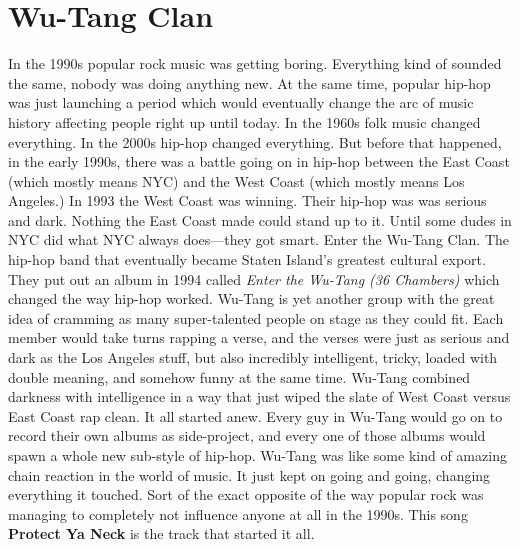 \documentclass[letterpaper,single]{article}
\begin{document}
\section{Wu-Tang Clan}
In the 1990s popular rock music was getting boring. Everything kind
of sounded the same, nobody was doing anything new. At the same time,
popular hip-hop was just launching a period which would eventually
change the arc of music history affecting people right up until today.
In the 1960s folk music changed everything. In the 2000s hip-hop changed
everything. But before that happened, in the early 1990s, there was a
battle going on in hip-hop between the East Coast (which mostly means
NYC) and the West Coast (which mostly means Los Angeles.) In 1993 the
West Coast was winning. Their hip-hop was was serious and dark. Nothing
the East Coast made could stand up to it. Until some dudes in NYC did
what NYC always does---they got smart. Enter the Wu-Tang Clan. The
hip-hop band that eventually became Staten Island's greatest cultural
export. They put out an album in 1994 called \emph{Enter the Wu-Tang (36
Chambers)} which changed the way hip-hop worked. Wu-Tang is yet another
group with the great idea of cramming as many super-talented people on
stage as they could fit. Each member would take turns rapping a verse,
and the verses were just as serious and dark as the Los Angeles stuff,
but also incredibly intelligent, tricky, loaded with double meaning,
and somehow funny at the same time. Wu-Tang combined darkness with
intelligence in a way that just wiped the slate of West Coast versus
East Coast rap clean. It all started anew. Every guy in Wu-Tang would
go on to record their own albums as side-project, and every one of
those albums would spawn a whole new sub-style of hip-hop. Wu-Tang was
like some kind of amazing chain reaction in the world of music. It just
kept on going and going, changing everything it touched. Sort of the
exact opposite of the way popular rock was managing to completely not
influence anyone at all in the 1990s. This song \textbf{Protect Ya Neck}
is the track that started it all.
\end{document}
